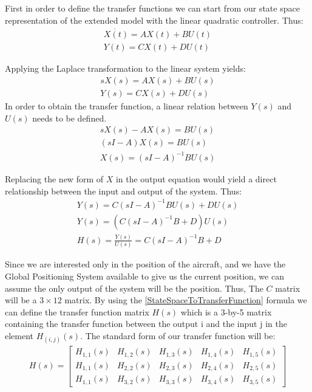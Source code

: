 \documentclass[twocolumn,showpacs,
    nofootinbib,aps,superscriptaddress,
    eqsecnum,prd,showkeys,10pt,floatfix]{revtex4}
\begin{document}
First in order to define the transfer functions we can start from our state
space representation of the extended model with the linear quadratic
controller. Thus:
\begin{align}
    \dot{X(t)}=AX(t)+BU(t) \\
    Y(t)=CX(t)+DU(t)
\end{align}
\par
Applying the Laplace transformation to the linear system yields:
\begin{align}
    s{X(s)}=AX(s)+BU(s) \\
    Y(s)=CX(s)+DU(s)
\end{align}
In order to obtain the transfer function, a linear relation between $Y(s)$ and $U(s)$ needs to be defined.
\begin{align}
    sX(s)-AX(s)=BU(s) \\
    (sI-A)X(s)=BU(s)  \\
    X(s)={(sI-A)}^{-1}BU(s)
\end{align}
\par
Replacing the new form of $X$ in the output equation would yield a direct
relationship between the input and output of the system. Thus:
\begin{align}
    Y(s)=C{(sI-A)}^{-1}BU(s)+DU(s) \\
    Y(s)=(C{(sI-A)}^{-1}B+D)U(s)   \\
    H(s)=\frac{Y(s)}{U(s)}={C(sI-A)}^{-1}B+D
    \label{StateSpaceToTransferFunction}
\end{align}
\par
Since we are interested only in the position of the aircraft, and we have the
Global Positioning System available to give us the current position, we can
assume the only output of the system will be the position. Thus, The $C$ matrix
will be a $3\times12$ matrix. By using the {\ref{StateSpaceToTransferFunction}}
formula we can define the transfer function matrix $H(s)$ which is a 3-by-5
matrix containing the transfer function between the output i and the input j in
the element $H_{(i,j)}(s)$. The standard form of our transfer function will be:
\begin{align}
    H(s)=\begin{bmatrix}
             H_{1,1}(s) & H_{1,2}(s) & H_{1,3}(s) & H_{1,4}(s) & H_{1,5}(s) \\
             H_{1,1}(s) & H_{2,2}(s) & H_{2,3}(s) & H_{2,4}(s) & H_{2,5}(s) \\
             H_{1,1}(s) & H_{3,2}(s) & H_{3,3}(s) & H_{3,4}(s) & H_{3,5}(s)
         \end{bmatrix}
\end{align}
\end{document}
